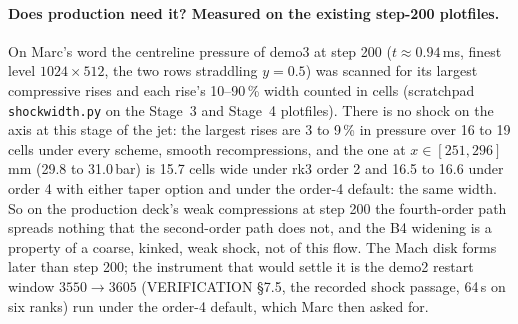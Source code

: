 \documentclass[11pt,a4paper]{article}
\newcommand{\code}[1]{\texttt{\small #1}}
\begin{document}
\paragraph{Does production need it?  Measured on the existing step-200 plotfiles.}
On Marc's word the centreline pressure of demo3 at step 200
($t \approx 0.94$\,ms, finest level $1024\times512$, the two rows
straddling $y = 0.5$) was scanned for its largest compressive rises and
each rise's 10--90\,\% width counted in cells (scratchpad
\code{shockwidth.py} on the Stage~3 and Stage~4 plotfiles).  There is no
shock on the axis at this stage of the jet: the largest rises are 3 to
9\,\% in pressure over 16 to 19 cells under every scheme, smooth
recompressions, and the one at $x \in [251, 296]$\,mm (29.8 to
31.0\,bar) is 15.7 cells wide under rk3 order 2 and 16.5 to 16.6 under
order 4 with either taper option and under the order-4 default: the same
width.  So on the production deck's weak compressions at step 200 the
fourth-order path spreads nothing that the second-order path does not,
and the B4 widening is a property of a coarse, kinked, weak shock, not
of this flow.  The Mach disk forms later than step 200; the instrument
that would settle it is the demo2 restart window $3550 \to 3605$
(VERIFICATION \S7.5, the recorded shock passage, 64\,s on six ranks)
run under the order-4 default, which Marc then asked for.
\end{document}
